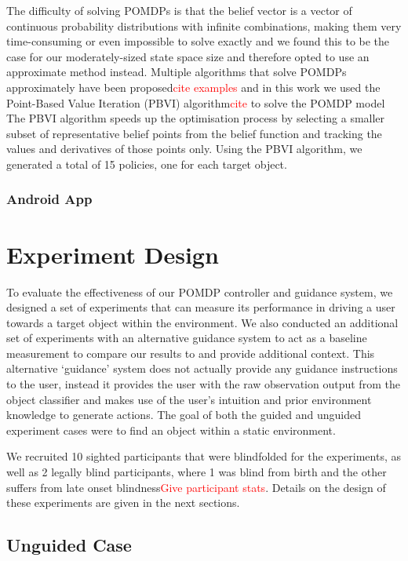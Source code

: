 \documentclass[runningheads]{llncs}
\newcommand\todo[1]{\textcolor{red}{#1}}
\begin{document}
The difficulty of solving POMDPs is that the belief vector is a vector of continuous probability distributions with infinite combinations, making them very time-consuming or even impossible to solve exactly and we found this to be the case for our moderately-sized state space size and therefore opted to use an approximate method instead.
Multiple algorithms that solve POMDPs approximately have been proposed\todo{cite examples} and in this work we used the Point-Based Value Iteration (PBVI) algorithm\todo{cite} to solve the POMDP model 
The PBVI algorithm speeds up the optimisation process by selecting a smaller subset of representative belief points from the belief function and tracking the values and derivatives of those points only. 
Using the PBVI algorithm, we generated a total of 15 policies, one for each target object. 

\subsubsection{Android App}

\section{Experiment Design}

To evaluate the effectiveness of our POMDP controller and guidance system, we designed a set of experiments that can measure its performance in driving a user towards a target object within the environment. 
We also conducted an additional set of experiments with an alternative guidance system to act as a baseline measurement to compare our results to and provide additional context. 
This alternative `guidance' system does not actually provide any guidance instructions to the user, instead it provides the user with the raw observation output from the object classifier and makes use of the user's intuition and prior environment knowledge to generate actions. 
The goal of both the guided and unguided experiment cases were to find an object within a static environment. 

We recruited 10 sighted participants that were blindfolded for the experiments, as well as 2 legally blind participants, where 1 was blind from birth and the other suffers from late onset blindness\todo{Give participant stats}.
Details on the design of these experiments are given in the next sections. 

\subsection{Unguided Case}
\end{document}
